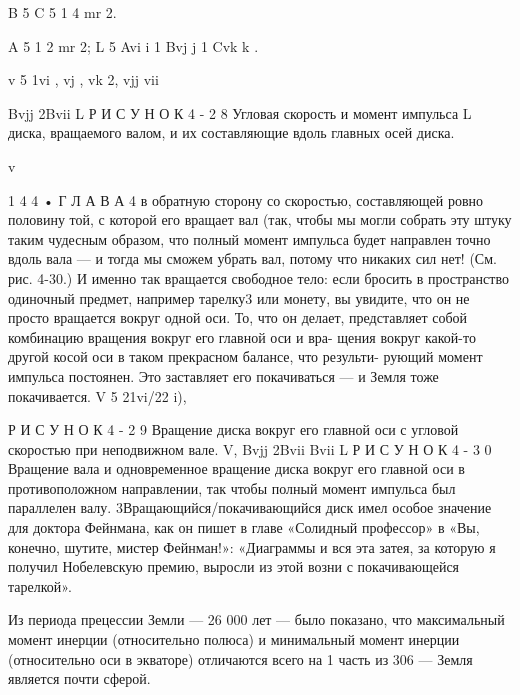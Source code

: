 \documentclass[10pt,oneside]{article}
\newcommand{\TipsRunning}[1]{\par\vspace{2bp}{\centering\footnotesize #1\par}\vspace{2bp}}
\newcommand{\TipsSubsection}[1]{\par\vspace{6bp}{\normalsize\bfseries #1\par}\vspace{2bp}}
\begin{document}
\TipsSubsection{4.1 говорит нам, что, вращая диск V, v A 5 2B 5 2C.}

B 5 C 5 1 4 mr 2.\par

A 5 1 2 mr 2; L 5 Avi i 1 Bvj j 1 Cvk k .\par

v 5 1vi , vj , vk 2, vjj vii\par

Bvjj 2Bvii L Р И С У Н О К  4 - 2 8 Угловая скорость и момент импульса L диска, вращаемого валом, и их составляющие вдоль главных осей диска.\par

v\par

1 4 4 • Г Л А В А  4 в обратную сторону со скоростью, составляющей ровно половину той, с которой его вращает вал (так, чтобы мы могли собрать эту штуку таким чудесным образом, что полный момент импульса будет направлен точно вдоль вала --- и тогда мы сможем убрать вал, потому что никаких сил нет! (См. рис. 4-30.) И именно так вращается свободное тело: если бросить в пространство одиночный предмет, например тарелку3 или монету, вы увидите, что он не просто вращается вокруг одной оси. То, что он делает, представляет собой комбинацию вращения вокруг его главной оси и вра- щения вокруг какой-то другой косой оси в таком прекрасном балансе, что результи- рующий момент импульса постоянен. Это заставляет его покачиваться --- и Земля тоже покачивается. V 5 21vi/22  i),\par

Р И С У Н О К  4 - 2 9 Вращение диска вокруг его главной оси с угловой скоростью при неподвижном вале. V, Bvjj 2Bvii Bvii L Р И С У Н О К  4 - 3 0 Вращение вала и одновременное вращение диска вокруг его главной оси в противоположном направлении, так чтобы полный момент импульса был параллелен валу. 3Вращающийся/покачивающийся диск имел особое значение для доктора Фейнмана, как он пишет в главе «Солидный профессор» в «Вы, конечно, шутите, мистер Фейнман!»: «Диаграммы и вся эта затея, за которую я получил Нобелевскую премию, выросли из этой возни с покачивающейся тарелкой».\par

\TipsRunning{Д И Н А М И Ч Е С К И Е  Э Ф Ф Е К Т Ы  И  И Х  П Р И М Е Н Е Н И Я • 1 4 5}

\TipsSubsection{4-11 Нутация Земли}

Из периода прецессии Земли --- 26 000 лет --- было показано, что максимальный момент инерции (относительно полюса) и минимальный момент инерции (относительно оси в экваторе) отличаются всего на 1 часть из 306 --- Земля является почти сферой.\par
\end{document}

